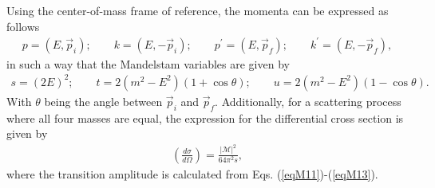\documentclass[11pt,showpacs,preprintnumbers,amsmath,amssymb,prd,nofootinbib,superscriptaddress]{revtex4-2}
\begin{document}
Using the center-of-mass frame of reference, the momenta can be expressed as follows
\begin{eqnarray}p=(E,\vec{p}_i);\quad\quad k=(E,-\vec{p}_i);\quad\quad p^\prime=(E,\vec{p}_f);\quad\quad k^\prime=(E,-\vec{p}_f),\end{eqnarray}
in such a way that the Mandelstam variables are given by
\begin{eqnarray}s=(2E)^2;\quad\quad t=2(m^2-E^2)(1+\cos{\theta});\quad\quad u=2(m^2-E^2)(1-\cos{\theta}).\end{eqnarray}
With $\theta$ being the angle between $\vec{p}_i$ and $\vec{p}_f$. Additionally, for a scattering process where all four masses are equal, the expression for the differential cross section is given by \cite{peskin}
\begin{eqnarray}\left(\frac{d\sigma}{d\Omega}\right)=\frac{|\mathcal{M}|^2}{64\pi^2 s},\label{sigma}
\end{eqnarray}
where the transition amplitude is calculated from Eqs. (\ref{eqM11})-(\ref{eqM13}).
\end{document}
